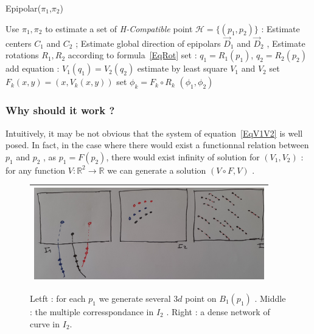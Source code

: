 \documentclass[a4paper]{article}
\newcommand{\RR}{\ensuremath{\mathbb{R}}}
\begin{document}
\begin{algorithm}
\caption{Epipolar($\pi_1$,$\pi_2$)}
\begin{algorithmic}
    \STATE Use $\pi_1,\pi_2$ to estimate a set of \emph{H-Compatible} point $\mathcal{H} =\{(p_1,p_2)\}$ : 
    \STATE Estimate centers $C_1$ and $C_2$ ;
    \STATE Estimate global direction of epipolars $\vec{D}_1$ and $\vec{D}_2$ ,
    \STATE Estimate rotations $R_1,R_2$ according to formula~\ref{EqRot}
              \STATE set : $q_1 = R_1(p_1)$,  $q_2 = R_2(p_2)$
              \STATE add equation : $V_1(q_1) = V_2(q_2)$
    \ENDFOR
    \STATE estimate by least square $V_1$ and $V_2$
    \STATE set $F_k(x,y)=(x,V_k(x,y))$  %
    \STATE set $\phi_k =  F_k \circ  R_k $ %
    \RETURN $(\phi_1,\phi_2)$
\end{algorithmic}
\label{AlgoGlob}
\end{algorithm}



\subsubsection{Why should it work ?}

Intuitively, it may be not obvious that the system of equation~\ref{EqV1V2} is well posed.
In fact, in the case where there would exist a functionnal relation between
$p_1$ and $p_2$ , as $p_1=F(p_2)$,  there would exist infinity of solution
for $(V_1,V_2)$ :   for any function $V: \RR^2 \rightarrow \RR $ we can generate a solution $(V\circ F, V)$ .

\begin{figure}
\centering
\begin{tabular}{||c||}
 \hline \hline
\includegraphics[width=10cm]{FIGS/NonFuncCorresp.jpg}
 \\ \hline \hline
\end{tabular}
\caption{Letft : for each $p_1$ we generate several $3d$ point on $B_1(p_1)$ . Middle :
         the multiple corresspondance in $I_2$ . Right : a dense network of curve in $I_2$.}
 
\label{NonFuncCorresp}
\end{figure}
\end{document}
